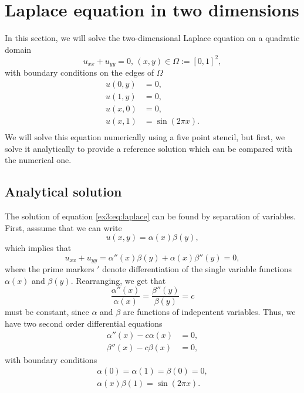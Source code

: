 \section{Laplace equation in two dimensions}
In this section, we will solve the two-dimensional Laplace equation on a quadratic domain
\begin{equation}
    u_{xx} + u_{yy} = 0, \, (x,y) \in \Omega := [0,1]^2,
    \label{ex3:eq:laplace}
\end{equation} with boundary conditions on the edges of $\Omega$
\begin{equation*}
    \begin{split}
        u(0,y) &= 0,\\
        u(1,y) &= 0,\\
        u(x,0) &= 0,\\
        u(x,1) &= \sin(2\pi x).\\
    \end{split}
\end{equation*}
We will solve this equation numerically using a five point stencil, but first, we solve it analytically to provide a reference solution which can be compared with the numerical one.

\subsection{Analytical solution}

The solution of equation \ref{ex3:eq:laplace} can be found by separation of variables.
First, asssume that we can write
\begin{equation*}
    u(x,y) = \alpha(x) \beta(y),
\end{equation*}
which implies that
\begin{equation*}
    u_{xx} + u_{yy} =  \alpha''(x) \beta(y) + \alpha(x) \beta''(y) = 0,
\end{equation*}
where the prime markers $'$ denote differentiation of the single variable functions $\alpha(x)$ and $\beta(y)$.
Rearranging, we get that
\begin{equation*}
    \frac{\alpha''(x)}{\alpha(x)} = \frac{\beta''(y)}{\beta(y)} = c
\end{equation*}
must be constant, since $\alpha$ and $\beta$ are functions of indepentent variables.
Thus, we have two second order differential equations
\begin{equation*}
    \begin{split}
        \alpha''(x) - c\alpha(x) &= 0, \\
        \beta''(x) - c\beta(x) &= 0,
    \end{split}
\end{equation*}
with boundary conditions
\begin{equation*}
    \begin{split}
    \alpha(0) = \alpha(1) = \beta(0) = 0,\\
    \alpha(x)\beta(1) = \sin(2\pi x).
    \end{split}
\end{equation*}

